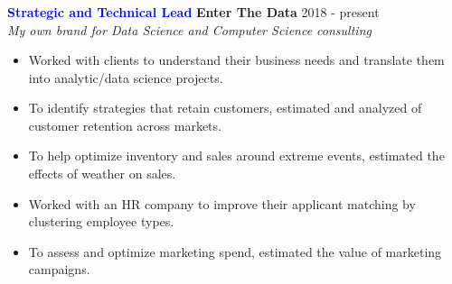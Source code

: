 \documentclass[10pt, letterpaper]{article} %
\providecommand{\tightlist}{%
  \setlength{\itemsep}{0pt}\setlength{\parskip}{0pt}}
\begin{document}

\vspace{-15pt}
{\subsubsection{} \label{enterthedata}}
\textbf{\textcolor{blue}  {Strategic and Technical Lead}} \hfill
 \textbf{Enter The Data} \hfill  
 \hfill 2018 - present\\
\emph {My own brand for Data Science and Computer Science consulting}

\begin{itemize}
\tightlist
\item Worked with clients to understand their business needs and translate them into analytic/data science projects.
\item To identify strategies that retain customers, estimated and analyzed of customer retention across markets.
\item To help optimize inventory and sales around extreme events,
estimated the effects of weather on sales.
\item Worked with an HR company to improve their applicant matching by clustering employee types.
\item To assess and optimize marketing spend, estimated the value of marketing campaigns.
\end{itemize}

\vspace{-18pt}
\hypertarget{lowes}
{\subsubsection{} \label{lowes}}
\end{document}
